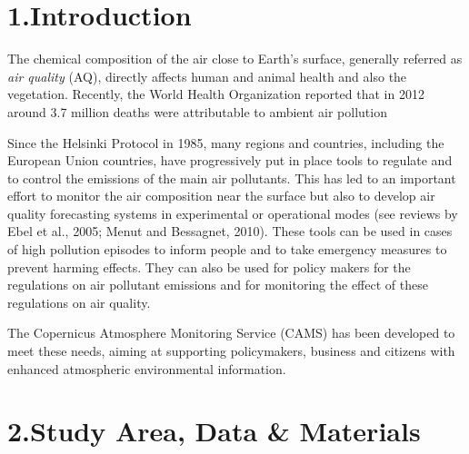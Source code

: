 \documentclass[9pt]{report}
\begin{document}
\noindent{}\newpage{}%


\section{1.\hspace*{0.5em}Introduction}\label{sec-introduction}%

\noindent{}The chemical composition of the air close to Earth’s surface, generally referred as \emph{air quality} (AQ), directly affects human and animal health and also the vegetation. 
Recently, the World Health Organization reported that in 2012 around 3.7 million deaths were attributable to ambient air pollution %

Since the Helsinki Protocol in 1985, many regions and countries, including the European Union countries, have progressively put in place tools to regulate and to control the emissions of the main air pollutants. 
This has led to an important effort to monitor the air composition near the surface but also to develop air quality forecasting systems in experimental or operational modes (see reviews by Ebel et al., 2005; Menut and Bessagnet, 2010).
These tools can be used in cases of high pollution episodes to inform people and to take emergency measures to prevent harming effects. 
They can also be used for policy makers for the regulations on air pollutant emissions and for monitoring the effect of these regulations on air quality.%

The Copernicus Atmosphere Monitoring Service (CAMS) 
has been developed to meet these needs, aiming at supporting policymakers, 
business and citizens with enhanced atmospheric environmental information.%

\section{2.\hspace*{0.5em}Study Area, Data \& Materials}\label{sec-study-area-data-materials}%
\end{document}
